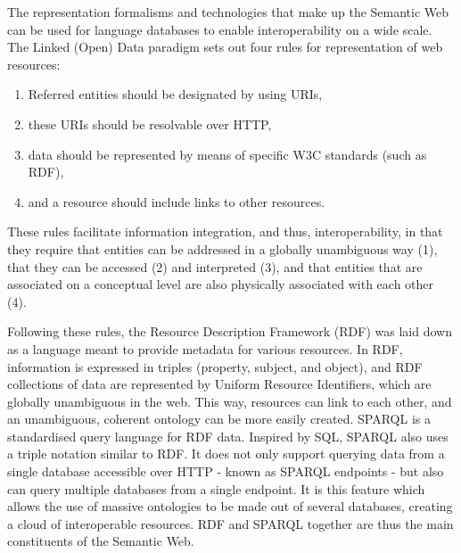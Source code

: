 The representation formalisms and technologies that make up the Semantic Web can be used for language databases to enable interoperability on a wide scale. The Linked (Open) Data paradigm \citep{bernersLee2006_linkeddata} sets out four rules for representation of web resources: 
\begin{enumerate}\item Referred entities should be designated by using URIs,
\item these URIs should be resolvable over HTTP,
\item data should be represented by means of specific W3C standards (such as RDF),
\item and a resource should include links to other resources. \end{enumerate}
These rules facilitate information integration, and thus, interoperability, in that they require that entities can be addressed in a globally unambiguous way (1), that they can be accessed (2) and interpreted (3), and that entities that are associated on a conceptual level are also physically associated with each other (4). 

Following these rules, the Resource Description Framework (RDF) was laid down as a language meant to provide metadata for various resources. In RDF, information is expressed in triples (property, subject, and object), and RDF collections of data are represented by Uniform Resource Identifiers, which are globally unambiguous in the web. This way, resources can link to each other, and an unambiguous, coherent ontology can be more easily created. SPARQL \cite{prud2008sparql}
is a standardised query language for RDF data. Inspired by SQL, SPARQL also uses a triple notation similar to RDF. It does not only support querying data from a single database accessible over HTTP - known as SPARQL endpoints - but also can query multiple databases from a single endpoint. It is this feature which allows the use of massive ontologies to be made out of several databases, creating a cloud of interoperable resources. RDF and SPARQL together are thus the main constituents of the Semantic Web. 

